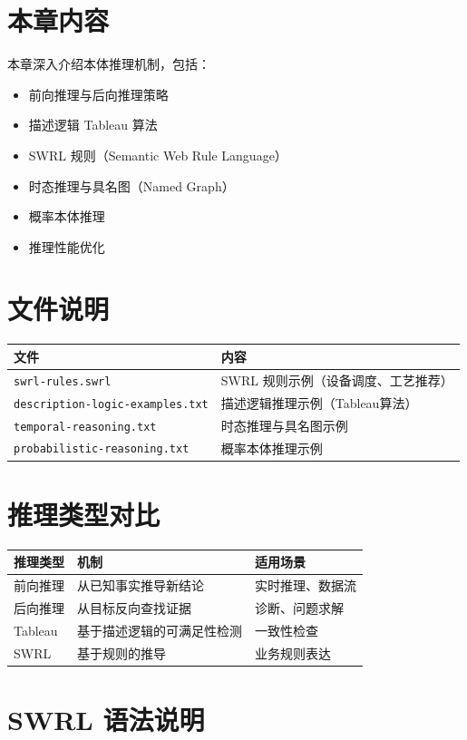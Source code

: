 
\section{本章内容}

本章深入介绍本体推理机制，包括：
\begin{itemize}
\item 前向推理与后向推理策略
\item 描述逻辑 Tableau 算法
\item SWRL 规则（Semantic Web Rule Language）
\item 时态推理与具名图（Named Graph）
\item 概率本体推理
\item 推理性能优化
\end{itemize}

\section{文件说明}

\begin{center}
\begin{tabularx}{\linewidth}{@{}XX@{}}
\toprule
\textbf{文件} & \textbf{内容} \\
\midrule
\texttt{swrl-rules.swrl} & SWRL 规则示例（设备调度、工艺推荐） \\
\texttt{description-logic-examples.txt} & 描述逻辑推理示例（Tableau算法） \\
\texttt{temporal-reasoning.txt} & 时态推理与具名图示例 \\
\texttt{probabilistic-reasoning.txt} & 概率本体推理示例 \\
\bottomrule
\end{tabularx}
\end{center}

\section{推理类型对比}

\begin{center}
\begin{tabular}{@{}lll@{}}
\toprule
\textbf{推理类型} & \textbf{机制} & \textbf{适用场景} \\
\midrule
前向推理 & 从已知事实推导新结论 & 实时推理、数据流 \\
后向推理 & 从目标反向查找证据 & 诊断、问题求解 \\
Tableau & 基于描述逻辑的可满足性检测 & 一致性检查 \\
SWRL & 基于规则的推导 & 业务规则表达 \\
\bottomrule
\end{tabular}
\end{center}

\section{SWRL 语法说明}

\begin{codebox}
\end{codebox}
